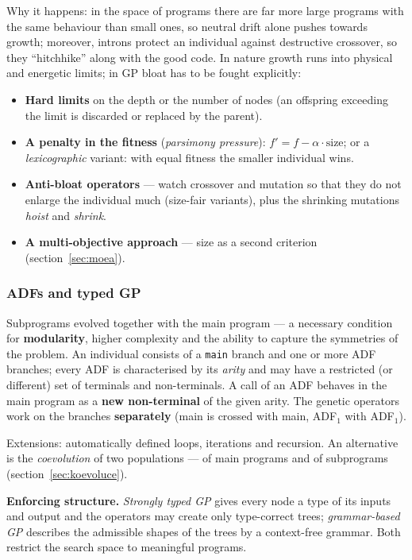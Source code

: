 \documentclass[11pt,a4paper]{article}
\theoremstyle{definition}
\providecommand{\uv}[1]{``#1''}
\begin{document}
Why it happens: in the space of programs there are far more large programs with the same
behaviour than small ones, so neutral drift alone pushes towards growth; moreover, introns
protect an individual against destructive crossover, so they \uv{hitchhike} along with the
good code. In nature growth runs into physical and energetic limits; in GP bloat has to be
fought explicitly:
\begin{itemize}
\item \textbf{Hard limits} on the depth or the number of nodes (an offspring exceeding the
  limit is discarded or replaced by the parent).
\item \textbf{A penalty in the fitness} (\emph{parsimony pressure}):
  $f' = f - \alpha \cdot \text{size}$; or a \emph{lexicographic} variant: with equal fitness
  the smaller individual wins.
\item \textbf{Anti-bloat operators} --- watch crossover and mutation so that they do not
  enlarge the individual much (size-fair variants), plus the shrinking mutations
  \emph{hoist} and \emph{shrink}.
\item \textbf{A multi-objective approach} --- size as a second criterion
  (section~\ref{sec:moea}).
\end{itemize}

\subsubsection{ADFs and typed GP}

\begin{defbox}
Subprograms evolved together with the main program --- a necessary condition for
\textbf{modularity}, higher complexity and the ability to capture the symmetries of the
problem. An individual consists of a \texttt{main} branch and one or more ADF branches;
every ADF is characterised by its \emph{arity} and may have a restricted (or different) set
of terminals and non-terminals. A call of an ADF behaves in the main program as a
\textbf{new non-terminal} of the given arity. The genetic operators work on the branches
\textbf{separately} (main is crossed with main, ADF$_1$ with ADF$_1$).

Extensions: automatically defined loops, iterations and recursion. An alternative is the
\emph{coevolution} of two populations --- of main programs and of subprograms
(section~\ref{sec:koevoluce}).
\end{defbox}

\textbf{Enforcing structure.} \emph{Strongly typed GP} gives every node a type of its inputs
and output and the operators may create only type-correct trees; \emph{grammar-based GP}
describes the admissible shapes of the trees by a context-free grammar. Both restrict the
search space to meaningful programs.
\end{document}
